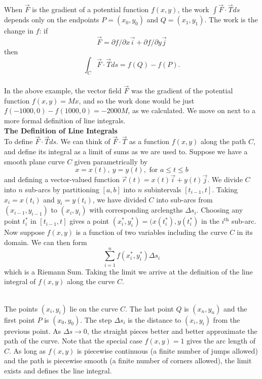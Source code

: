 {
When $\vec F$ is the gradient of a potential function $f(x, y)$, the work $\int \vec F \cdot \vec T ds$ depends only on the endpoints $P = (x_0,y_0)$ and $Q = (x_1,y_1)$. The work is the change in $f$: if
$$\vec F = \partial f/\partial x \vec i + \partial f/\partial y \vec j$$
then
$$\int_C \vec F \cdot \vec T ds = f(Q) - f(P).$$
}\\

In the above example, the vector field $\vec F$ was the gradient of the potential function $f(x,y) = Mx$, and so the work done would be just $f(-1000,0) - f(1000,0) = -2000M$, as we calculated.  We move on next to a more formal definition of line integrals. \\




\noindent\textbf{\large The Definition of Line Integrals}\\

To define $\vec F \cdot \vec T ds$. We can think of $\vec F \cdot \vec T$ as a function $f(x, y)$
along the path $C$, and define its integral as a limit of sums as we are used to. Suppose we have a smooth plane curve $C$ given parametrically by
$$x = x(t), \: y = y(t), \text{ for } a \leq t \leq b$$
and defining a vector-valued function $\vec r (t) = x(t) \vec i + y(t) \vec j$.  We divide $C$ into $n$ sub-arcs by partitioning $[a,b]$ into $n$ subintervals $[t_{i-1},t]$. Taking $x_i = x(t_i)$ and $y_i = y(t_i)$, we have divided $C$ into sub-arcs from $(x_{i-1},y_{i-1})$ to $(x_i,y_i)$ with corresponding arclengths $\Delta s_i$.  Choosing any point $t_i^{\ast}$ in $[t_{i-1},t]$ gives a point $(x_i^{\ast},y_i^{\ast}) = (x(t_i^{\ast}), y(t_i^{\ast})$ in the $i^{\text{th}}$ sub-arc.\\

Now suppose $f(x,y)$ is a function of two variables including the curve $C$ in its domain.  We can then form
$$\sum_{i=1}^{n} f(x_i^{\ast},y_i^{\ast}) \Delta s_i$$
which is a Riemann Sum.  Taking the limit we arrive at the definition of the line integral of $f(x,y)$ along the curve $C$.


\\


The points $(x_i, y_i)$ lie on the curve $C$. The last point $Q$ is $(x_n, y_n)$ and the first point $P$ is $(x_0, y_0)$. The step $\Delta s_i$ is the distance to $(x_i, y_i)$ from the previous point. As $\Delta s \to 0$, the straight pieces better and better approximate the path of the curve. Note that the special case $f(x,y) = 1$ gives the arc length of $C$. As long as $f(x, y)$ is piecewise continuous (a finite number of jumps allowed) and the path is piecewise smooth (a finite number of corners allowed), the limit exists and defines the line integral.\\

